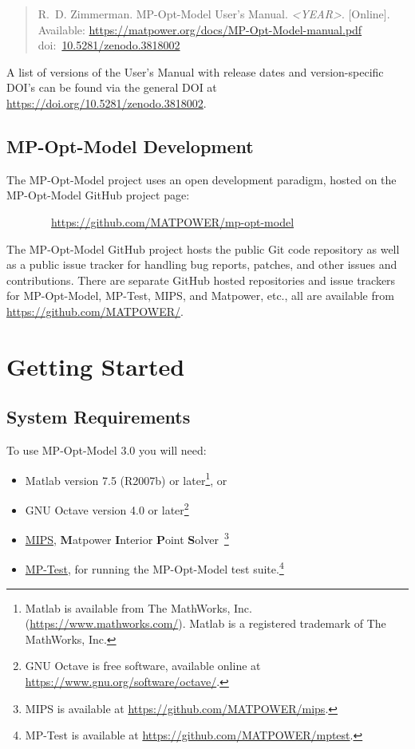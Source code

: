 \documentclass[12pt]{article}
\newcommand{\matlab}[0]{{\sc Matlab}}
\newcommand{\matpower}[0]{{\sc Matpower}}
\newcommand{\mptest}[0]{{MP-Test}}
\newcommand{\mptesturl}[0]{https://github.com/MATPOWER/mptest}
\newcommand{\mptestlink}[0]{\href{\mptesturl}{\mptest{}}}
\newcommand{\mips}[0]{{MIPS}}
\newcommand{\mipsurl}[0]{https://github.com/MATPOWER/mips}
\newcommand{\mipslink}[0]{\href{\mipsurl}{\mips{}}}
\newcommand{\mipsname}[0]{{{\bf M}{\sc atpower} \textbf{I}nterior \textbf{P}oint \textbf{S}olver}}
\newcommand{\mpom}[0]{\mbox{MP-Opt-Model}}
\newcommand{\mpomurl}[0]{https://github.com/MATPOWER/mp-opt-model}
\newcommand{\mpomname}[0]{\mpom{}}
\newcommand{\mpomver}[0]{3.0}
\newcommand{\doi}[1]{doi:~\href{https://doi.org/#1}{#1}}
\numberwithin{equation}{section}
\numberwithin{table}{section}
\numberwithin{figure}{section}
\begin{document}
\begin{quote}
\footnotesize
R.~D. Zimmerman. \mpomname{} User's Manual. \emph{\textless{}YEAR\textgreater{}}.
[Online]. Available: \url{https://matpower.org/docs/MP-Opt-Model-manual.pdf}\\
\doi{10.5281/zenodo.3818002}
\end{quote}
A list of versions of the User's Manual with release dates and
version-specific DOI's can be found via the general DOI at
\url{https://doi.org/10.5281/zenodo.3818002}.

\subsection{\mpom{} Development}
\label{sec:development}

The \mpom{} project uses an open development paradigm, hosted on the \mpom{} GitHub project page:

\bigskip

~~~~~~~~\url{\mpomurl}

\bigskip

The \mpom{} GitHub project hosts the public Git code repository as well as a public issue tracker for handling bug reports, patches, and other issues and contributions. There are separate GitHub hosted repositories and issue trackers for \mpom{}, \mptest{}, \mips{}, and \matpower{}, etc., all are available from \url{https://github.com/MATPOWER/}.


\clearpage
\section{Getting Started}


\subsection{System Requirements}
\label{sec:sysreq}
To use \mpom{} \mpomver{} you will need:
\begin{itemize}
\item \matlab{}\textsuperscript{\tiny \textregistered} version 7.5 (R2007b) or later\footnote{\matlab{} is available from The MathWorks, Inc. (\url{https://www.mathworks.com/}). \matlab{} is a registered trademark of The MathWorks, Inc.}, or
\item GNU Octave version 4.0 or later\footnote{GNU Octave \cite{octave} is free software, available online at \url{https://www.gnu.org/software/octave/}.}
\item \mipslink{}, \mipsname{}~\cite{wang2007a, mips_manual}\footnote{\mips{} is available at \url{\mipsurl}.}
\item \mptestlink{}, for running the \mpom{} test suite.\footnote{\mptest{} is available at \url{\mptesturl}.}
\end{itemize}
\end{document}
